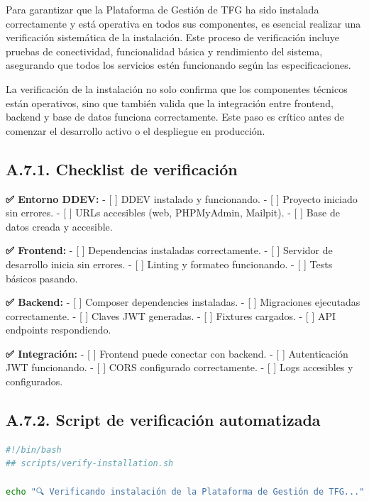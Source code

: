 \documentclass[12pt,a4paper,oneside]{report}
\begin{document}
{Para garantizar que la Plataforma de Gestión de TFG ha sido instalada
correctamente y está operativa en todos sus componentes, es esencial
realizar una verificación sistemática de la instalación. Este proceso de
verificación incluye pruebas de conectividad, funcionalidad básica y
rendimiento del sistema, asegurando que todos los servicios estén
funcionando según las especificaciones.

La verificación de la instalación no solo confirma que los componentes
técnicos están operativos, sino que también valida que la integración
entre frontend, backend y base de datos funciona correctamente. Este
paso es crítico antes de comenzar el desarrollo activo o el despliegue
en producción.

\subsection{A.7.1. Checklist de
verificación}\label{a.7.1.-checklist-de-verificaciuxf3n}

\textbf{✅ Entorno DDEV:} - {[} {]} DDEV instalado y funcionando. - {[}
{]} Proyecto iniciado sin errores. - {[} {]} URLs accesibles (web,
PHPMyAdmin, Mailpit). - {[} {]} Base de datos creada y accesible.

\textbf{✅ Frontend:} - {[} {]} Dependencias instaladas correctamente. -
{[} {]} Servidor de desarrollo inicia sin errores. - {[} {]} Linting y
formateo funcionando. - {[} {]} Tests básicos pasando.

\textbf{✅ Backend:} - {[} {]} Composer dependencies instaladas. - {[}
{]} Migraciones ejecutadas correctamente. - {[} {]} Claves JWT
generadas. - {[} {]} Fixtures cargados. - {[} {]} API endpoints
respondiendo.

\textbf{✅ Integración:} - {[} {]} Frontend puede conectar con backend.
- {[} {]} Autenticación JWT funcionando. - {[} {]} CORS configurado
correctamente. - {[} {]} Logs accesibles y configurados.

\subsection{A.7.2. Script de verificación
automatizada}\label{a.7.2.-script-de-verificaciuxf3n-automatizada}

\begin{lstlisting}[language=bash]
#!/bin/bash
## scripts/verify-installation.sh

echo "🔍 Verificando instalación de la Plataforma de Gestión de TFG..."


\end{lstlisting}}
\end{document}
